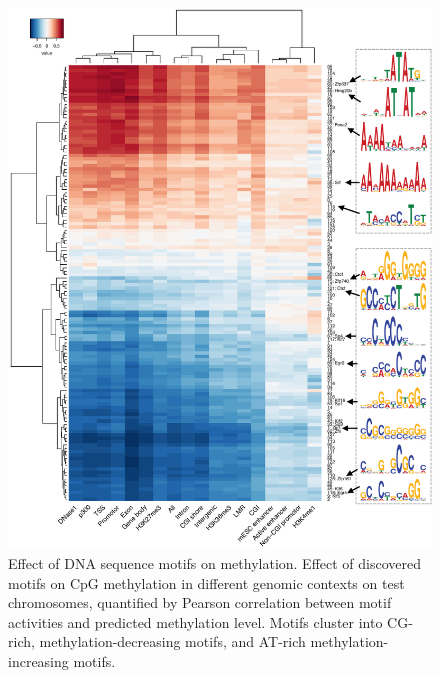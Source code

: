\begin{figure}[htbp!]
\centering
\includegraphics[width=1.0\textwidth]{motifs_cor}
\caption[Effect of DNA sequence motifs on methylation.]{Effect of DNA sequence motifs on methylation. Effect of discovered motifs on CpG methylation in different genomic contexts on test chromosomes, quantified by Pearson correlation between motif activities and predicted methylation level. Motifs cluster into CG-rich, methylation-decreasing motifs, and AT-rich methylation-increasing motifs.}
\label{fig:dcpg_motifs_cor}
\end{figure}

